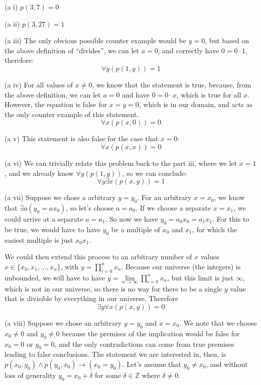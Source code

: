 \documentclass{article}
\newcommand{\T}{1}
\newcommand{\F}{0}
\newcommand{\subproblem}[1]{(#1)}
\begin{document}
\begin{multicols*}{2}
\subproblem{a i} $p(3,7) = \boxed{\F}$

\subproblem{a ii} $p(3, 27) = \boxed{\T}$

\subproblem{a iii} The only obvious possible counter example would be
$y=0$, but based on the above definition of ``divides'', we can let
$a=0$, and correctly have $0=0\cdot{}1$, therefore: \[
\forall y(p(1, y)) = \boxed{\T}
\]

\subproblem{a iv} For all values of $x\ne 0$, we know that the
statement is true, because, from the above definition, we can let
$a=0$ and have $0=0\cdot x$, which is true for all $x$. However, the
equation is false for $x=y=0$, which is in our domain, and acts as the
only counter example of this statement.
\[
\forall x(p(x, 0)) = \boxed{\F}
\]

\subproblem{a v} This statement is also false for the case that $x=0$: \[
\forall x(p(x,x)) = \boxed{\F}
\]

\subproblem{a vi} We can trivially relate this problem back to the
part iii, where we let $x=1$, and we already know $\forall y(p(1,y))$,
so we can conclude: \[
\forall y\exists x(p(x,y)) = \boxed{\T}
\]

\subproblem{a vii} Suppose we chose a arbitrary $y=y_0$. For an
arbitrary $x=x_0$, we know that $\exists a(y_0=ax_0)$, so let's choose
$a=a_0$. If we choose a separate $x=x_1$, we could arrive at a
separate $a=a_1$. So now we have $y_0=a_0x_0=a_1x_1$. For this to be
true, we would have to have $y_0$ be a multiple of $x_0$ and $x_1$,
for which the easiest multiple is just $x_0x_1$.

We could then extend this process to an arbitrary number of $x$ values
$x\in\{x_0,x_1,\dots,x_n\}$, with $y=\prod\limits_{i=0}^nx_n$. Because
our universe (the integers) is unbounded, we will have to have
$y=\lim\limits_{n\rightarrow{}\infty}\prod\limits_{i=0}^nx_n$, but this limit
is just $\infty$, which is not in our universe, so there is no way for
there to be a single $y$ value that is divisible by everything in our
universe. Therefore \[
\exists y\forall x(p(x,y)) = \boxed{\F}
\]

\subproblem{a viii} Suppose we chose an arbitrary $y=y_0$ and
$x=x_0$. We note that we choose $x_0\ne{}0$ and $y_0\ne{}0$ because
the premises of the implication would be false for $x_0=0$ or $y_0=0$,
and the only contradictions can come from true premises leading to
false conclusions. The statement we are interested in, then, is
$p(x_0,y_0)\wedge{}p(y_0,x_0)\rightarrow(x_0=y_0)$. Let's assume that
$y_0\ne{}x_0$, and without loss of generality $y_0=x_0+\delta$ for
some $\delta\in\mathbb{Z}$ where $\delta\ne{}0$.


\end{multicols*}
\end{document}
